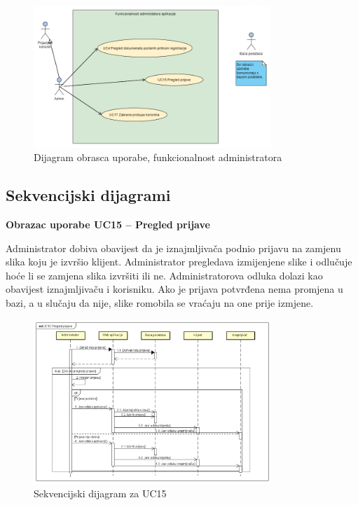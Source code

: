 					\begin{figure}[H]
						\centering
						\includegraphics[width=0.8\textwidth]{dijagrami/admin.png}
						\caption{Dijagram obrasca uporabe, funkcionalnost administratora}
						\label{fig:your_label}
					\end{figure}

			\eject		
				
			\subsection{Sekvencijski dijagrami}
			
				\noindent \textbf{Obrazac uporabe UC15 – Pregled prijave}
				
				\noindent Administrator dobiva obavijest da je iznajmljivača podnio prijavu na zamjenu slika koju je izvršio klijent. Administrator pregledava izmijenjene slike i odlučuje hoće li se zamjena slika izvršiti ili ne. Administratorova odluka dolazi kao obavijest iznajmljivaču i korisniku. Ako je prijava potvrđena nema promjena u bazi, a u slučaju da nije, slike romobila se vraćaju na one prije izmjene.
				
				\begin{figure}[H]
					\centering
					\includegraphics[width=0.8\textwidth]{dijagrami/UC15_Pregled_prijave.png}
					\caption{Sekvencijski dijagram za UC15}
					\label{fig:your_label}
				\end{figure}
				

